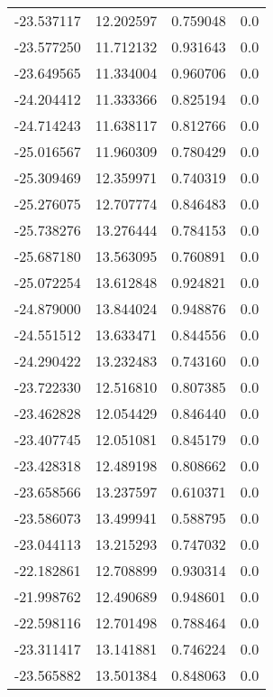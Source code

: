 \begin{tabular}{rrrr}
      -23.537117 &        12.202597 &    0.759048 &   0.0 \\
      -23.577250 &        11.712132 &    0.931643 &   0.0 \\
      -23.649565 &        11.334004 &    0.960706 &   0.0 \\
      -24.204412 &        11.333366 &    0.825194 &   0.0 \\
      -24.714243 &        11.638117 &    0.812766 &   0.0 \\
      -25.016567 &        11.960309 &    0.780429 &   0.0 \\
      -25.309469 &        12.359971 &    0.740319 &   0.0 \\
      -25.276075 &        12.707774 &    0.846483 &   0.0 \\
      -25.738276 &        13.276444 &    0.784153 &   0.0 \\
      -25.687180 &        13.563095 &    0.760891 &   0.0 \\
      -25.072254 &        13.612848 &    0.924821 &   0.0 \\
      -24.879000 &        13.844024 &    0.948876 &   0.0 \\
      -24.551512 &        13.633471 &    0.844556 &   0.0 \\
      -24.290422 &        13.232483 &    0.743160 &   0.0 \\
      -23.722330 &        12.516810 &    0.807385 &   0.0 \\
      -23.462828 &        12.054429 &    0.846440 &   0.0 \\
      -23.407745 &        12.051081 &    0.845179 &   0.0 \\
      -23.428318 &        12.489198 &    0.808662 &   0.0 \\
      -23.658566 &        13.237597 &    0.610371 &   0.0 \\
      -23.586073 &        13.499941 &    0.588795 &   0.0 \\
      -23.044113 &        13.215293 &    0.747032 &   0.0 \\
      -22.182861 &        12.708899 &    0.930314 &   0.0 \\
      -21.998762 &        12.490689 &    0.948601 &   0.0 \\
      -22.598116 &        12.701498 &    0.788464 &   0.0 \\
      -23.311417 &        13.141881 &    0.746224 &   0.0 \\
      -23.565882 &        13.501384 &    0.848063 &   0.0 \\

\end{tabular}
